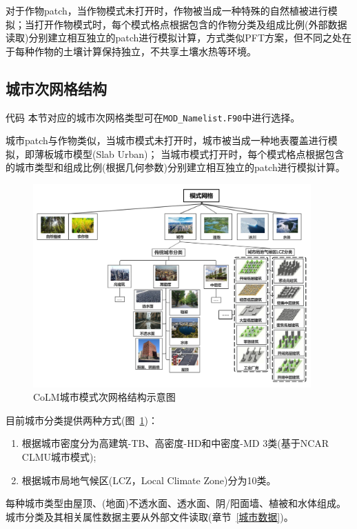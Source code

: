 对于作物patch，当作物模式未打开时，作物被当成一种特殊的自然植被进行模拟；当打开作物模式时，每个模式格点根据包含的作物分类及组成比例(外部数据读取)分别建立相互独立的patch进行模拟计算，方式类似PFT方案，但不同之处在于每种作物的土壤计算保持独立，不共享土壤水热等环境。

\subsection{城市次网格结构}
\begin{mymdframed}{代码}
本节对应的城市次网格类型可在\texttt{MOD\_Namelist.F90}中进行选择。
\end{mymdframed}

城市patch与作物类似，当城市模式未打开时，城市被当成一种地表覆盖进行模拟，即薄板城市模型(Slab Urban)；
当城市模式打开时，每个模式格点根据包含的城市类型和组成比例(根据几何参数)分别建立相互独立的patch进行模拟计算。

{
\begin{figure}[htbp]
\centering
\includegraphics[width=0.95\textwidth]{Figures/模式构架/CoLM城市次网格示意图.jpg}
\caption[CoLM城市模式次网格结构示意图]{CoLM城市模式次网格结构示意图}
\label{fig:城市次网格}
\end{figure}
}

目前城市分类提供两种方式(图~\ref{fig:城市次网格})：
\begin{enumerate}
    \item 根据城市密度分为高建筑-TB、高密度-HD和中密度-MD 3类(基于NCAR CLMU城市模式);
    \item 根据城市局地气候区(LCZ，Local Climate Zone)分为10类。
\end{enumerate}
每种城市类型由屋顶、(地面)不透水面、透水面、阴/阳面墙、植被和水体组成。
城市分类及其相关属性数据主要从外部文件读取(章节~\ref{城市数据})。

